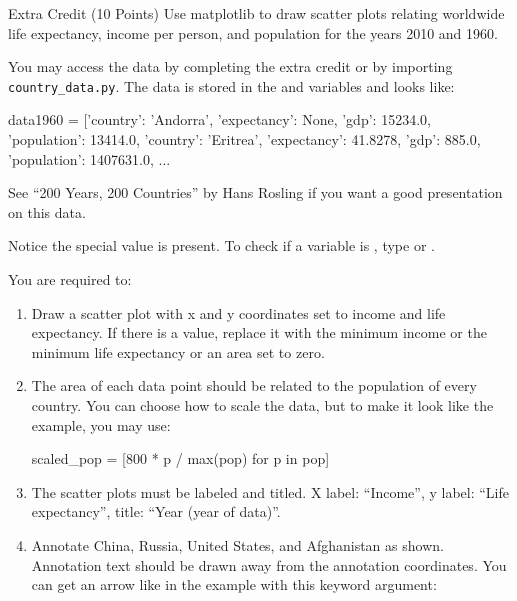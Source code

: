\documentclass[11pt]{cselabheader}
\begin{document}
\begin{infobox}{Extra Credit (10 Points)}
Use matplotlib to draw scatter plots relating worldwide life expectancy,
income per person, and population for the years 2010 and 1960.

You may access the data by completing the extra credit or by importing
\texttt{country\_data.py}. The data is stored in the 
and  variables and looks like:

\begin{python3code}
data1960 = [{'country': 'Andorra',
    'expectancy': None,
    'gdp': 15234.0,
    'population': 13414.0},
   {'country': 'Eritrea',
    'expectancy': 41.8278,
    'gdp': 885.0,
    'population': 1407631.0}, ...
\end{python3code}

See ``200 Years, 200 Countries'' by Hans Rosling if you want a
good presentation on this data.

Notice the special value  is present.
To check if a variable  is ,
type  or .


You are required to:

\begin{enumerate}
\item Draw a scatter plot with x and y coordinates set to income and life
expectancy. If there is a  value, replace it with the
minimum income or the minimum life expectancy or an area set to zero.

\item The area of each data point should be related to the population of every
country. You can choose how to scale the data, but to make it look like the
example, you may use:

\begin{python3code}
scaled_pop = [800 * p / max(pop) for p in pop]
\end{python3code}

\item The scatter plots must be labeled and titled. X label: ``Income'', y
label: ``Life expectancy'', title: ``Year (year of data)''.

\item Annotate China, Russia, United States, and Afghanistan as shown.
Annotation text should be drawn away from the annotation coordinates.
You can get an arrow like in the example with this keyword argument:


\end{enumerate}
\end{infobox}
\end{document}
